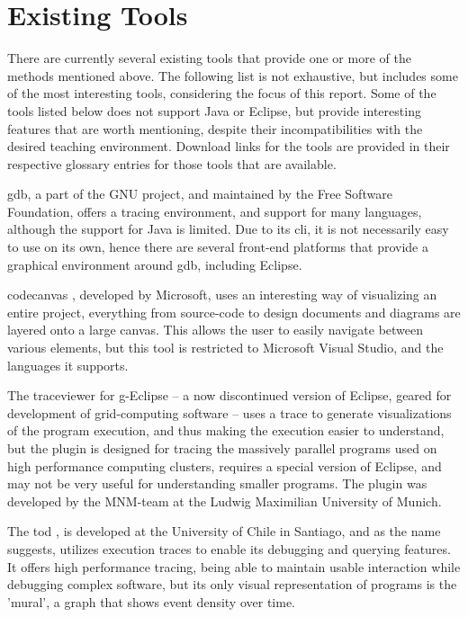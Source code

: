 \section{Existing Tools}\label{PreTools}%

There are currently several existing tools that provide one or more of the methods mentioned above.
The following list is not exhaustive, but includes some of the most interesting tools, considering the focus of this report.
Some of the tools listed below does not support Java or Eclipse, but provide interesting features that are worth mentioning, despite their incompatibilities with the desired teaching environment.
Download links for the tools are provided in their respective glossary entries for those tools that are available.

\gls{gdb}, a part of the GNU project, and maintained by the Free Software Foundation, offers a tracing environment, and support for many languages, although the support for Java is limited.
Due to its \gls{cli}, it is not necessarily easy to use on its own, hence there are several front-end platforms that provide a graphical environment around \gls{gdb}, including Eclipse.

\Gls{codecanvas} \cite{Deline2010}, developed by Microsoft, uses an interesting way of visualizing an entire project, everything from source-code to design documents and diagrams are layered onto a large canvas.
This allows the user to easily navigate between various elements, but this tool is restricted to Microsoft Visual Studio, and the languages it supports.

The \gls{traceviewer} \cite{Thomas2010} for g-Eclipse -- a now discontinued version of Eclipse, geared for development of grid-computing software -- uses a trace to generate visualizations of the program execution, and thus making the execution easier to understand, but the plugin is designed for tracing the massively parallel programs used on high performance computing clusters, requires a special version of Eclipse, and may not be very useful for understanding smaller programs.
The plugin was developed by the MNM-team at the Ludwig Maximilian University of Munich.

The \gls{tod} \cite{Pothier2007}, is developed at the University of Chile in Santiago, and as the name suggests, utilizes execution traces to enable its debugging and querying features.
It offers high performance tracing, being able to maintain usable interaction while debugging complex software, but its only visual representation of programs is the 'mural', a graph that shows event density over time.

